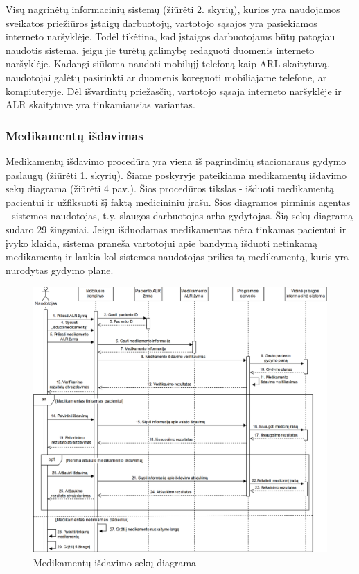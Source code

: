 Visų nagrinėtų informacinių sistemų (žiūrėti 2. skyrių), kurios yra naudojamos sveikatos priežiūros įstaigų darbuotojų, vartotojo sąsajos yra pasiekiamos interneto naršyklėje. Todėl tikėtina, kad įstaigos darbuotojams būtų patogiau naudotis sistema, jeigu jie turėtų galimybę redaguoti duomenis interneto naršyklėje. Kadangi siūloma naudoti mobilųjį telefoną kaip ARL skaitytuvą, naudotojai galėtų pasirinkti ar duomenis koreguoti mobiliajame telefone, ar kompiuteryje. Dėl išvardintų priežasčių, vartotojo sąsaja interneto naršyklėje ir ALR skaitytuve yra tinkamiausias variantas.

\subsubsection{Medikamentų išdavimas}
Medikamentų išdavimo procedūra yra viena iš pagrindinių stacionaraus gydymo paslaugų (žiūrėti 1. skyrių). Šiame poskyryje pateikiama medikamentų išdavimo sekų diagrama (žiūrėti 4 pav.). Šios procedūros tikslas - išduoti medikamentą pacientui ir užfiksuoti šį faktą medicininiu įrašu. Šios diagramos pirminis agentas - sistemos naudotojas, t.y. slaugos darbuotojas arba gydytojas. Šią sekų diagramą sudaro 29 žingsniai. Jeigu išduodamas medikamentas nėra tinkamas pacientui ir įvyko klaida, sistema praneša vartotojui apie bandymą išduoti netinkamą medikamentą ir laukia kol sistemos naudotojas prilies tą medikamentą, kuris yra nurodytas gydymo plane.

\begin{figure}[H]
    \centering
    \includegraphics[scale=0.27]{images/israsytiVaistai}
    \caption{Medikamentų išdavimo sekų diagrama} 
\end{figure}

